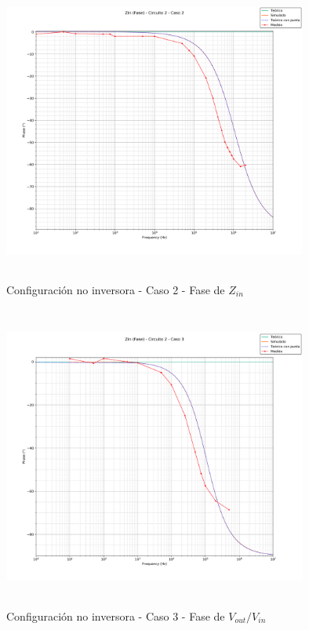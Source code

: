 \begin{figure}[H] %
	\centering
	\includegraphics[width=10cm,height=10cm,keepaspectratio]{../EJ1/00GRAFICOS/c2c2/c2c2zinFASE.png}
	\caption{Configuración no inversora - Caso 2 - Fase de $Z_{in}$}
	\label{c2c2zinP}
\end{figure}


\begin{figure}[H] %
	\centering
	\includegraphics[width=10cm,height=10cm,keepaspectratio]{../EJ1/00GRAFICOS/c2c3/c2c3zinFASE.png}
	\caption{Configuración no inversora - Caso 3 - Fase de $V_{out}/V_{in}$}
	\label{c2c3zinP}
\end{figure}




